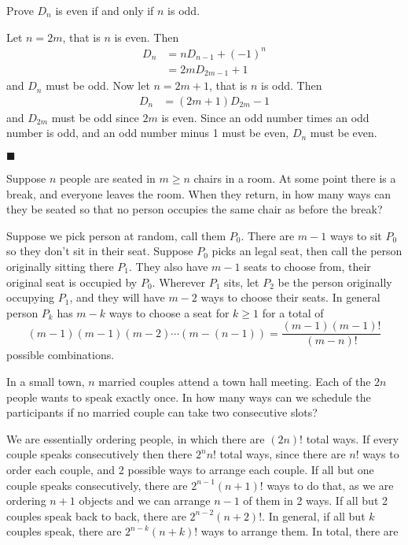 \documentclass[12pt]{article}
\renewcommand{\qed}{\hfill$\blacksquare$}
\renewenvironment{proof}{\vspace{1em}\begin{addmargin}[2em]{0em}\begin{newproof}}{\end{newproof}\end{addmargin}\qed}
\newenvironment{exercise}[2][Exercise]{\begin{trivlist}
\item[\hskip \labelsep {\bfseries #1} \hskip \labelsep {\bfseries #2.}]}{\end{trivlist}}
\newenvironment{problem}[2][Problem]{\begin{trivlist}
\item[\hskip \labelsep {\bfseries #1} \hskip \labelsep {\bfseries #2.}]}{\end{trivlist}}
\begin{document}
\begin{exercise}{2.2.2 (2pt)}
	Prove $D_n$ is even if and only if $n$ is odd.	
\end{exercise}	
\begin{proof}
	Let $n = 2m$, that is $n$ is even. Then
	\begin{align*}
		D_n &= nD_{n-1} + (-1)^n \\
		    &= 2mD_{2m-1} + 1
	\end{align*}
	and $D_n$ must be odd. Now let $n= 2m + 1$, that is $n$ is odd. Then
	\begin{align*}
		D_n &= (2m + 1)D_{2m} - 1
	\end{align*}
	and $D_{2m}$ must be odd since $2m$ is even. Since an odd number times an odd number is odd, and an odd number minus 1 must be even, $D_n$ must be even.
\end{proof}
\begin{exercise}{2.2.11 (2pt)}
	Suppose $n$ people are seated in $m\ge n$ chairs in a room. At some point there is a break, and everyone leaves the room. When they return, in how many ways can they be seated so that no person occupies the same chair as before the break? 
\end{exercise}
Suppose we pick person at random, call them $P_0$. There are $m-1$ ways to sit $P_0$ so they don't sit in their seat. Suppose $P_0$ picks an legal seat, then call the person originally sitting there $P_1$. They also have $m-1$ seats to choose from, their original seat is occupied by $P_0$. Wherever $P_1$ sits, let $P_2$ be the person originally occupying $P_1$, and they will have $m-2$ ways to choose their seats. In general person $P_k$ has $m - k$ ways to choose a seat for $k \ge 1$ for a total of
\[
	(m-1)(m-1)(m-2)\cdots(m-(n-1)) = \frac{(m-1)(m-1)!}{(m-n)!}
\]
possible combinations.
\begin{problem}{9 (3pt)}
	In a small town, $n$ married couples attend a town hall meeting. Each of
the $2n$ people wants to speak exactly once. In how many ways can we
schedule the participants if no married couple can take two consecutive
slots?
\end{problem}
We are essentially ordering people, in which there are $(2n)!$ total ways. If every couple speaks consecutively then there $2^{n}n!$ total ways, since there are $n!$ ways to order each couple, and 2 possible ways to arrange each couple. If all but one couple speaks consecutively, there are $2^{n-1}(n+1)!$ ways to do that, as we are ordering $n+1$ objects and we can arrange $n-1$ of them in 2 ways. If all but 2 couples speak back to back, there are $2^{n-2}(n+2)!$. In general, if all but $k$ couples speak, there are $2^{n-k}(n+k)!$ ways to arrange them. In total, there are
\end{document}
